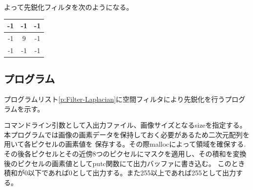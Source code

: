 \documentclass[11pt,a4paper,titlepage,dvipdfmx]{jarticle}
\begin{document}
    よって先鋭化フィルタを次のようになる。
    \begin{table}[H]
      \centering
      \begin{tabular}{|c|c|c|}
      \hline
      -1 & -1  & -1 \\\hline
      -1 & 9 & -1 \\\hline
      -1 & -1  & -1 \\\hline
      \end{tabular}
    \end{table}
  \subsection{プログラム}
    プログラムリスト\ref{p:Filter-Laplacian}に空間フィルタにより先鋭化を行うプログラムを示す。
    

    コマンドライン引数として入出力ファイル、画像サイズとなるsizeを指定する。本プログラムでは画像の画素データを保持しておく必要があるため二次元配列を用いて各ピクセルの画素値を
    保存する。その際mallocによって領域を確保する.その後各ピクセルとその近傍8つのピクセルにマスクを適用し、その積和を変換後のピクセルの画素値としてputc関数にて出力バッファに書き込む。
    このとき積和が0以下であれば0として出力する。また255以上であれば255として出力する。
  
\end{document}
